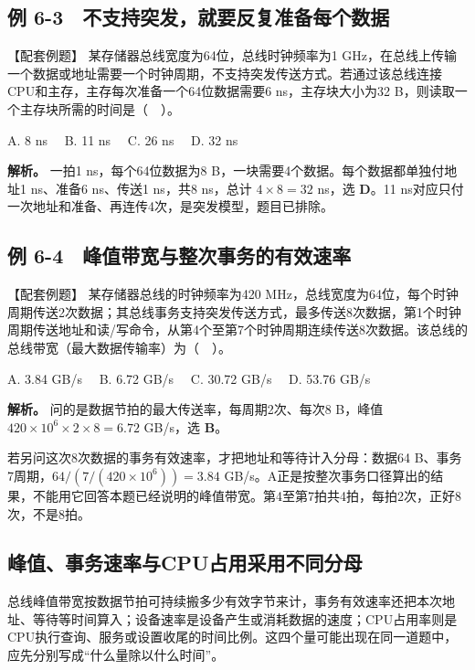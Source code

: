 \subsection{例 6-3　不支持突发，就要反复准备每个数据}\label{CO06-example-3}

【配套例题】 某存储器总线宽度为64位，总线时钟频率为1 GHz，在总线上传输一个数据或地址需要一个时钟周期，不支持突发传送方式。若通过该总线连接CPU和主存，主存每次准备一个64位数据需要6 ns，主存块大小为32 B，则读取一个主存块所需的时间是（　）。

A. 8 ns　 B. 11 ns　 C. 26 ns　 D. 32 ns

\textbf{解析。} 一拍1 ns，每个64位数据为8 B，一块需要4个数据。每个数据都单独付地址1 ns、准备6 ns、传送1 ns，共8 ns，总计 \(4\times8=32\) ns，选 \textbf{D}。11 ns对应只付一次地址和准备、再连传4次，是突发模型，题目已排除。

\subsection{例 6-4　峰值带宽与整次事务的有效速率}\label{CO06-example-4}

【配套例题】 某存储器总线的时钟频率为420 MHz，总线宽度为64位，每个时钟周期传送2次数据；其总线事务支持突发传送方式，最多传送8次数据，第1个时钟周期传送地址和读/写命令，从第4个至第7个时钟周期连续传送8次数据。该总线的总线带宽（最大数据传输率）为（　）。

A. 3.84 GB/s　 B. 6.72 GB/s　 C. 30.72 GB/s　 D. 53.76 GB/s

\textbf{解析。} 问的是数据节拍的最大传送率，每周期2次、每次8 B，峰值 \(420\times10^6\times2\times8=6.72\) GB/s，选 \textbf{B}。

若另问这次8次数据的事务有效速率，才把地址和等待计入分母：数据64 B、事务7周期，\(64/(7/(420\times10^6))=3.84\) GB/s。A正是按整次事务口径算出的结果，不能用它回答本题已经说明的峰值带宽。第4至第7拍共4拍，每拍2次，正好8次，不是8拍。

\subsection{峰值、事务速率与CPU占用采用不同分母}\label{ux5cf0ux503cux4e8bux52a1ux901fux7387ux4e0ecpuux5360ux7528ux91c7ux7528ux4e0dux540cux5206ux6bcd}

总线峰值带宽按数据节拍可持续搬多少有效字节来计，事务有效速率还把本次地址、等待等时间算入；设备速率是设备产生或消耗数据的速度；CPU占用率则是CPU执行查询、服务或设置收尾的时间比例。这四个量可能出现在同一道题中，应先分别写成``什么量除以什么时间''。

